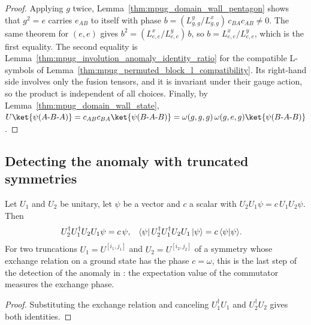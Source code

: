 \begin{proof}\leanok
    Applying $g$ twice, Lemma~\ref{thm:mpug_domain_wall_pentagon} shows that
    $g^2=e$ carries $e_{AB}$ to itself with phase
    $b=(L^y_{g,g}/L^x_{g,g})\,c_{BA}c_{AB}\neq0$. The same theorem for $(e,e)$
    gives $b^2=(L^x_{e,e}/L^y_{e,e})\,b$, so $b=L^x_{e,e}/L^y_{e,e}$, which is
    the first equality. The second equality is
    Lemma~\ref{thm:mpug_involution_anomaly_identity_ratio} for the compatible
    L-symbols of Lemma~\ref{thm:mpug_permuted_block_l_compatibility}. Its
    right-hand side involves only the fusion tensors, and it is invariant
    under their gauge action, so the product is independent of all choices.
    Finally, by Lemma~\ref{thm:mpug_domain_wall_state},
    $U\ket{\psi(A\text{-}B\text{-}A)}=c_{AB}c_{BA}\ket{\psi(B\text{-}A\text{-}B)}
        =\omega(g,g,g)\,\omega(g,e,g)\ket{\psi(B\text{-}A\text{-}B)}$.
\end{proof}

\subsection{Detecting the anomaly with truncated symmetries}

\begin{lemma}
    \label{lem:mpug_truncation_commutator}
    \leanok
    Let $U_1$ and $U_2$ be unitary, let $\psi$ be a vector and $c$ a scalar
    with $U_2U_1\psi=c\,U_1U_2\psi$. Then
    \begin{align}
        U_2^\dagger U_1^\dagger U_2U_1\psi
         & =c\,\psi,
         &
        \langle\psi|\,U_2^\dagger U_1^\dagger U_2U_1\,|\psi\rangle
         & =c\,\langle\psi|\psi\rangle.
        \notag
    \end{align}
    For two truncations $U_1=U^{[i_1,j_1]}$ and $U_2=U^{[i_2,j_2]}$ of a
    symmetry whose exchange relation on a ground state has the phase
    $c=\omega$, this is the last step of the detection of the anomaly in
    \cite[Section~V]{GarreRubioSchuch2024DomainWall}: the expectation value of
    the commutator measures the exchange phase.
\end{lemma}

\begin{proof}\leanok
    Substituting the exchange relation and canceling $U_1^\dagger U_1$ and
    $U_2^\dagger U_2$ gives both identities.
\end{proof}

